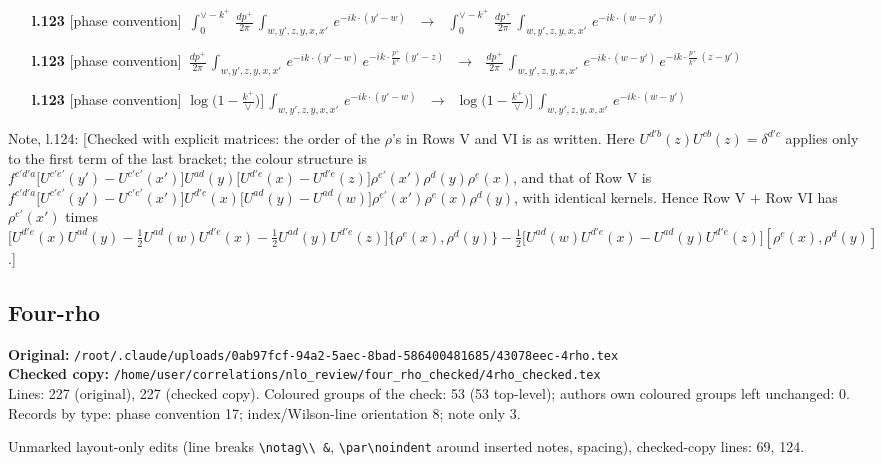 \documentclass[10pt]{article}
\newenvironment{notebox}{\def\FrameCommand{{\color{notebar}\vrule width 1.5pt}\hspace{6pt}}\MakeFramed{\advance\hsize-\width\FrameRestore}\small}{\endMakeFramed}
\begin{document}
\begin{itemize}[leftmargin=2.2em,itemsep=1pt,topsep=2pt]
\item[\textbf{l.123}] \textsf{\small [phase convention]} $\displaystyle \,\int_{0}^{\vee-k^{+}}\, \frac{dp^{+}}{2\pi}\, \int_{w,y',z,y,x,x'}\, e^{-ik\cdot (y'-w)}\,$\ $\longrightarrow$\ $\displaystyle \,\int_{0}^{\vee-k^{+}}\, \frac{dp^{+}}{2\pi}\, \int_{w,y',z,y,x,x'}\, e^{-ik\cdot (w-y')}\,$
\item[\textbf{l.123}] \textsf{\small [phase convention]} $\displaystyle \, \frac{dp^{+}}{2\pi}\, \int_{w,y',z,y,x,x'}\, e^{-ik\cdot (y'-w)}\, e^{-ik\cdot \frac{p^{+}}{k^{+}}\,(y'-z)}\,$\ $\longrightarrow$\ $\displaystyle \, \frac{dp^{+}}{2\pi}\, \int_{w,y',z,y,x,x'}\, e^{-ik\cdot (w-y')}\, e^{-ik\cdot \frac{p^{+}}{k^{+}}\,(z-y')}\,$
\item[\textbf{l.123}] \textsf{\small [phase convention]} $\displaystyle \log\Big(1-\frac{k^{+}}{\vee}\Big)\Big]\, \int_{w,y',z,y,x,x'}\, e^{-ik\cdot (y'-w)}\,$\ $\longrightarrow$\ $\displaystyle \log\Big(1-\frac{k^{+}}{\vee}\Big)\Big]\, \int_{w,y',z,y,x,x'}\, e^{-ik\cdot (w-y')}\,$
\end{itemize}
\begin{notebox}\textsf{\small Note, l.124:} [Checked with explicit matrices: the order of the $\rho$'s in Rows V and VI is as written. Here $U^{d'b}(z)U^{cb}(z)=\delta^{d'c}$ applies only to the first term of the last bracket; the colour structure is $f^{c'd'a}\big[U^{c'e'}(y')-U^{c'e'}(x')\big]U^{ad}(y)\big[U^{d'e}(x)-U^{d'e}(z)\big]\rho^{e'}(x')\rho^{d}(y)\rho^{e}(x)$, and that of Row V is $f^{c'd'a}\big[U^{c'e'}(y')-U^{c'e'}(x')\big]U^{d'e}(x)\big[U^{ad}(y)-U^{ad}(w)\big]\rho^{e'}(x')\rho^{e}(x)\rho^{d}(y)$, with identical kernels. Hence Row V $+$ Row VI has $\rho^{e'}(x')$ times $\big[U^{d'e}(x)U^{ad}(y)-\frac12U^{ad}(w)U^{d'e}(x)-\frac12U^{ad}(y)U^{d'e}(z)\big]\{\rho^{e}(x),\rho^{d}(y)\}-\frac12\big[U^{ad}(w)U^{d'e}(x)-U^{ad}(y)U^{d'e}(z)\big][\rho^{e}(x),\rho^{d}(y)]$.]\end{notebox}
\bigskip
\subsection{Four-rho}\label{sec:file-four_rho}
\noindent\textbf{Original:} \texttt{/root/.claude/uploads/0ab97fcf-94a2-5aec-8bad-586400481685/43078eec-4rho.tex}\\\textbf{Checked copy:} \texttt{/home/user/correlations/nlo\_review/four\_rho\_checked/4rho\_checked.tex}\\
Lines: 227 (original), 227 (checked copy). Coloured groups of the check: 53 (53 top-level); author\textquotesingle s own coloured groups left unchanged: 0.\\
Records by type: phase convention 17; index/Wilson-line orientation 8; note only 3.
\par\noindent Unmarked layout-only edits (line breaks \texttt{\textbackslash notag\textbackslash\textbackslash\ \&}, \texttt{\textbackslash par\textbackslash noindent} around inserted notes, spacing), checked-copy lines: 69, 124.
\end{document}
